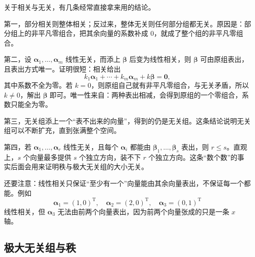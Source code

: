 关于相关与无关，有几条经常直接拿来用的结论。

第一，部分相关则整体相关；反过来，整体无关则任何部分组都无关。原因是：部分组上的非平凡零组合，把其余向量的系数补成 $0$，就成了整个组的非平凡零组合。

第二，设 $\boldsymbol{\alpha}_1,\ldots,\boldsymbol{\alpha}_m$ 线性无关，而添上 $\boldsymbol{\beta}$ 后变为线性相关，则 $\boldsymbol{\beta}$ 可由原组表出，且表出方式唯一。证明很短：相关给出
\[
k_1\boldsymbol{\alpha}_1+\cdots+k_m\boldsymbol{\alpha}_m+k\boldsymbol{\beta}=\boldsymbol{0},
\]
其中系数不全为零。若 $k=0$，则原组自己就有非平凡零组合，与无关矛盾，所以 $k\neq0$，解出 $\boldsymbol{\beta}$ 即可。唯一性来自：两种表出相减，会得到原组的一个零组合，系数只能全为零。

第三，无关组添上一个“表不出来的向量”，得到的仍是无关组。这条结论说明无关组可以不断扩充，直到张满整个空间。

第四，若 $\boldsymbol{\alpha}_1,\ldots,\boldsymbol{\alpha}_r$ 线性无关，且每个 $\boldsymbol{\alpha}_i$ 都能由 $\boldsymbol{\beta}_1,\ldots,\boldsymbol{\beta}_s$ 表出，则 $r\le s$。直观上，$s$ 个向量最多提供 $s$ 个独立方向，装不下 $r$ 个独立方向。这条“数个数”的事实后面会用来证明秩与极大无关组的大小无关。

还要注意：线性相关只保证“至少有一个”向量能由其余向量表出，不保证每一个都能。例如
\[
\boldsymbol{\alpha}_1=(1,0)^{\mathrm T},\quad
\boldsymbol{\alpha}_2=(2,0)^{\mathrm T},\quad
\boldsymbol{\alpha}_3=(0,1)^{\mathrm T}
\]
线性相关，但 $\boldsymbol{\alpha}_3$ 无法由前两个向量表出，因为前两个向量张成的只是一条 $x$ 轴。

\subsection{极大无关组与秩}


